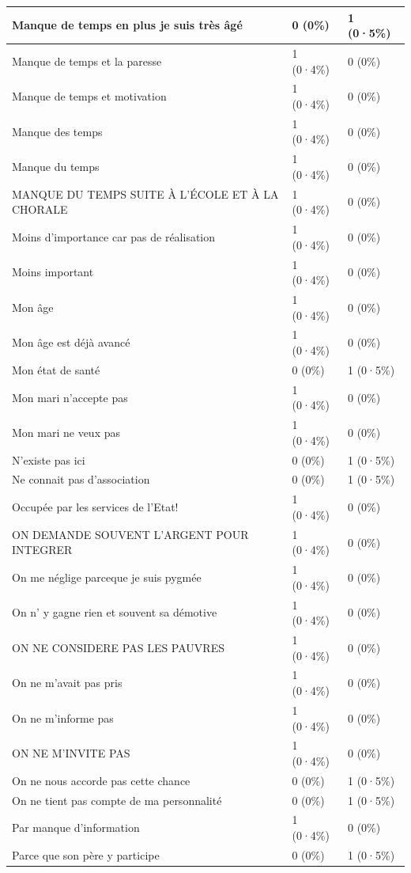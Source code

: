 \documentclass[
]{book}
\begin{document}
\begin{tabular}{l|l|l}
\hline
Manque de temps en plus je suis très âgé & 0 (0\%) & 1 (0·5\%)\\
\hline
Manque de temps et la paresse & 1 (0·4\%) & 0 (0\%)\\
\hline
Manque de temps et motivation & 1 (0·4\%) & 0 (0\%)\\
\hline
Manque des temps & 1 (0·4\%) & 0 (0\%)\\
\hline
Manque du temps & 1 (0·4\%) & 0 (0\%)\\
\hline
MANQUE DU TEMPS SUITE À L'ÉCOLE ET À LA CHORALE & 1 (0·4\%) & 0 (0\%)\\
\hline
Moins d'importance car pas de réalisation & 1 (0·4\%) & 0 (0\%)\\
\hline
Moins important & 1 (0·4\%) & 0 (0\%)\\
\hline
Mon âge & 1 (0·4\%) & 0 (0\%)\\
\hline
Mon âge est déjà avancé & 1 (0·4\%) & 0 (0\%)\\
\hline
Mon état de santé & 0 (0\%) & 1 (0·5\%)\\
\hline
Mon mari n'accepte pas & 1 (0·4\%) & 0 (0\%)\\
\hline
Mon mari ne veux pas & 1 (0·4\%) & 0 (0\%)\\
\hline
N'existe pas ici & 0 (0\%) & 1 (0·5\%)\\
\hline
Ne connait pas d'association & 0 (0\%) & 1 (0·5\%)\\
\hline
Occupée par les services de l'Etat! & 1 (0·4\%) & 0 (0\%)\\
\hline
ON DEMANDE SOUVENT L'ARGENT POUR INTEGRER & 1 (0·4\%) & 0 (0\%)\\
\hline
On me néglige parceque je suis pygmée & 1 (0·4\%) & 0 (0\%)\\
\hline
On n' y gagne rien et souvent sa démotive & 1 (0·4\%) & 0 (0\%)\\
\hline
ON NE CONSIDERE PAS LES PAUVRES & 1 (0·4\%) & 0 (0\%)\\
\hline
On ne m'avait pas pris & 1 (0·4\%) & 0 (0\%)\\
\hline
On ne m'informe pas & 1 (0·4\%) & 0 (0\%)\\
\hline
ON NE M'INVITE PAS & 1 (0·4\%) & 0 (0\%)\\
\hline
On ne nous accorde pas cette chance & 0 (0\%) & 1 (0·5\%)\\
\hline
On ne tient pas compte de ma personnalité & 0 (0\%) & 1 (0·5\%)\\
\hline
Par manque d'information & 1 (0·4\%) & 0 (0\%)\\
\hline
Parce que son père y participe & 0 (0\%) & 1 (0·5\%)\\

\end{tabular}
\end{document}

